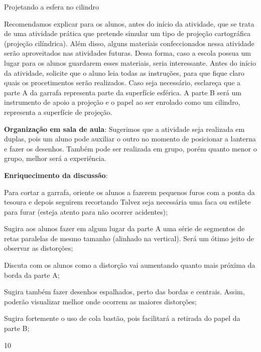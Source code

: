 \begin{Recomenda}{Projetando a esfera no cilindro}
{
  Recomendamos explicar para os alunos, antes do início da atividade, que se trata de uma atividade prática que pretende simular um tipo de projeção cartográfica (projeção cilíndrica). Além disso, alguns materiais confeccionados nessa atividade serão aproveitados nas atividades futuras. Dessa forma, caso a escola possua um lugar para os alunos guardarem esses materiais, seria interessante. Antes do início da atividade, solicite que o aluno leia todas as instruções, para que fique claro quais os procetimentos serão realizados. Caso seja necessário, esclareça que a parte  A da garrafa representa parte da superfície esférica. A parte B será um instrumento de apoio a projeção e o papel ao ser enrolado como um cilindro, representa a superfície de projeção.

  \textbf{Organização em sala de aula}: Sugerimos que a atividade seja realizada em duplas, pois um aluno pode auxiliar o outro no momento de posicionar a lanterna e fazer os desenhos. Também pode ser realizada em grupo, porém quanto menor o grupo, melhor será a experiência.

  \textbf{Enriquecimento da discussão}:

  Para cortar a garrafa, oriente os alunos a fazerem pequenos furos com a ponta da tesoura e depois seguirem recortando Talvez seja necessária uma faca ou estilete para furar (esteja atento para não ocorrer acidentes);

  Sugira aos alunos fazer em algum lugar da parte A uma série de segmentos de retas paralelas de mesmo tamanho (alinhado na vertical). Será um ótimo jeito de observar as distorções;

  Discuta com os alunos como a distorção vai aumentando quanto mais próxima da borda da parte A;

  Sugira também fazer desenhos espalhados, perto das bordas e centrais. Assim, poderão visualizar melhor onde ocorrem as maiores distorções;

  Sugira fortemente o uso de cola bastão, pois facilitará a retirada do papel da parte B;

 
}{1}{0}
\end{Recomenda}
\clearmargin

